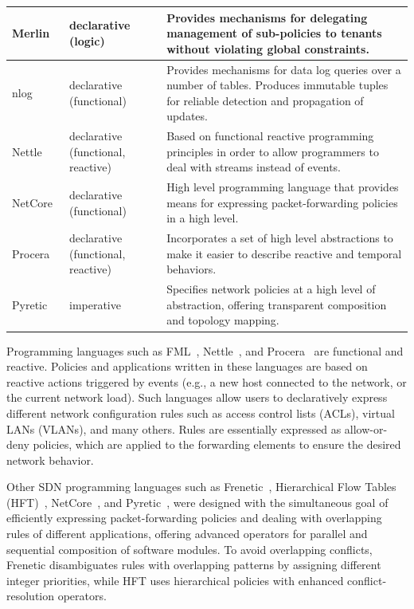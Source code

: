 {\begin{table}[!htp]
\begin{center}
\begin{tabularx}{\linewidth}{p{2cm}p{4cm}X}
Merlin~\cite{soule2013} & declarative (logic) & Provides mechanisms for delegating management of sub-policies to tenants without violating global constraints. \\\hline
nlog~\cite{koponen} & declarative (functional) &  Provides mechanisms for data log queries over a number of tables. Produces immutable tuples for reliable detection and propagation of updates. \\\hline
Nettle~\cite{voellmy2011-1}   & declarative (functional, reactive) & Based on functional reactive programming  principles in order to allow programmers to deal with streams instead of events.   \\\hline
NetCore~\cite{monsanto2012}  & declarative (functional) & High level programming language that provides means for expressing packet-forwarding policies in a high level.  \\\hline
Procera~\cite{voellmy2012}  & declarative (functional, reactive) & Incorporates a set of high level abstractions to make it easier to describe reactive and temporal behaviors.  \\\hline
Pyretic~\cite{monsanto2013}  & imperative & Specifies network policies at a high level of abstraction, offering transparent composition and topology mapping. \\\hline
\end{tabularx}
\end{center}
\end{table}
}


Programming languages such as FML~\cite{hinrichs2009}, 
Nettle~\cite{voellmy2011-1}, and Procera~\cite{voellmy2012}
are functional and reactive.
Policies and applications written in these languages are based on reactive actions triggered by events (e.g., a new host connected to the network, or the current network load).
Such languages allow users to declaratively express different network configuration rules such as access control lists (ACLs), virtual LANs (VLANs), and many others.
Rules are essentially expressed as allow-or-deny policies, which 
are applied to the forwarding elements to ensure the desired network behavior.

Other SDN programming languages such as Frenetic~\cite{foster2011},
Hierarchical Flow Tables (HFT)~\cite{ferguson2012}, NetCore~\cite{monsanto2012}, and
Pyretic~\cite{monsanto2013}, were designed with the simultaneous goal of efficiently expressing packet-forwarding policies and dealing with overlapping rules of different applications, offering advanced operators for parallel and sequential composition of software modules.
To avoid overlapping conflicts, Frenetic disambiguates rules 
with overlapping patterns by assigning different integer priorities, while HFT uses hierarchical policies with 
enhanced conflict-resolution operators.

